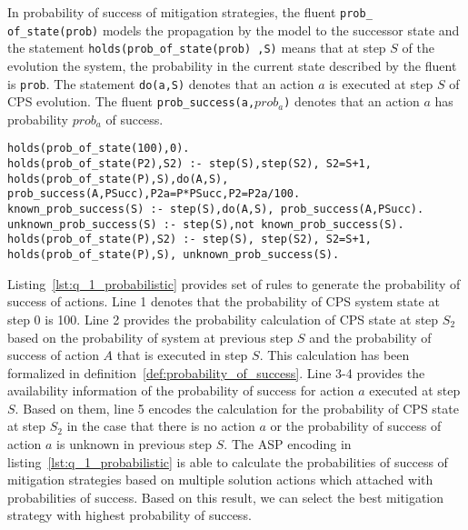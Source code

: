In probability of success of mitigation strategies, the fluent {\tt \small prob\_ of\_state(prob)} models the propagation by the model to the successor state and the statement {\tt holds(prob\_of\_state(prob) ,S)} means that  at step $S$ of the evolution the system, the probability in the current state described by the fluent is {\tt prob}. The statement {\tt do(a,S)} denotes that an action $a$ is executed at step $S$ of CPS evolution. The fluent {\tt prob\_success(a,$prob_a$)} denotes that an action $a$ has probability $prob_a$ of success.
%
\begin{lstlisting}[language=clingo,caption=Probability of success of mitigation strategies, label=lst:q_1_probabilistic, mathescape=true,xleftmargin=.01\textwidth, breaklines=true]
holds(prob_of_state(100),0).
holds(prob_of_state(P2),S2) :- step(S),step(S2), S2=S+1, holds(prob_of_state(P),S),do(A,S), prob_success(A,PSucc),P2a=P*PSucc,P2=P2a/100.
known_prob_success(S) :- step(S),do(A,S), prob_success(A,PSucc).
unknown_prob_success(S) :- step(S),not known_prob_success(S).
holds(prob_of_state(P),S2) :- step(S), step(S2), S2=S+1, holds(prob_of_state(P),S), unknown_prob_success(S).
\end{lstlisting}
Listing~\ref{lst:q_1_probabilistic} provides set of rules to generate the probability of success of actions. Line 1 denotes that the probability of CPS system state at step 0 is 100. Line 2 provides the probability calculation of CPS state at step $S_2$ based on the probability of system at previous step $S$ and the probability of success of action $A$ that is executed in step $S$. This calculation has been formalized in definition~\ref{def:probability_of_success}. Line 3-4 provides the availability information of the probability of success for action $a$ executed at step $S$. Based on them, line 5 encodes the calculation for the probability of CPS state at step $S_2$ in the case that there is no action $a$ or the probability of success of action $a$ is unknown in previous step $S$.
The ASP encoding in listing~\ref{lst:q_1_probabilistic} is able to calculate the probabilities of success of mitigation strategies based on multiple solution actions which attached with probabilities of success. Based on this result, we can select the best mitigation strategy with highest probability of success.
%
\begin{lstlisting}[language=clingo,caption=Likelihood of Concern Satisifaction, label=lst:q_1_likelihood, mathescape=true,xleftmargin=.01\textwidth, breaklines=true]

\end{lstlisting}
